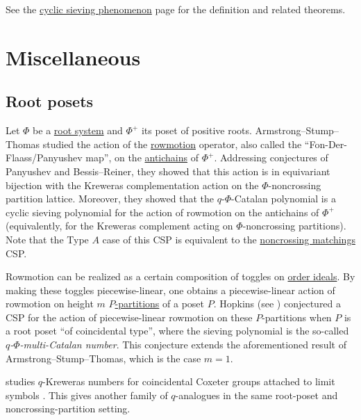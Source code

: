 
See the \hyperref[cyclicSieving]{cyclic sieving phenomenon}
page for the definition and related theorems.

\section[cspMisc]{Miscellaneous}


\subsection[cspListPosetsRoot]{Root posets}


Let $\Phi$ be a \hyperref[rootSystem]{root system} and $\Phi^+$ its poset of positive roots.
Armstrong--Stump--Thomas \cite{ArmstrongStumpThomas2013} studied the action of
the \hyperref[rowmotion]{rowmotion} operator, also called the
\enquote{Fon-Der-Flaass/Panyushev map}, on the \hyperref[antichain]{antichains}
of $\Phi^+$.
Addressing conjectures of Panyushev and Bessis--Reiner, they showed that this action is
in equivariant bijection with the Kreweras complementation action on
the $\Phi$-noncrossing partition lattice.
Moreover, they showed that the $q$-$\Phi$-Catalan polynomial is a cyclic sieving polynomial
for the action of rowmotion on the antichains of $\Phi^+$ (equivalently, for
the Kreweras complement acting on $\Phi$-noncrossing partitions).
Note that the Type $A$ case of this CSP is equivalent to
the \hyperref[cspNonCrossingMatchingsI]{noncrossing matchings} CSP.


Rowmotion can be realized as a certain composition of toggles on
\hyperref[orderIdeal]{order ideals}.
By making these toggles piecewise-linear, one obtains a piecewise-linear action
of rowmotion on height $m$ \hyperref[pPartition]{$P$-partitions} of a poset $P$.
Hopkins (see \cite{Hopkins2024}) conjectured a CSP for the action
of piecewise-linear rowmotion on these $P$-partitions when $P$ is a
root poset \enquote{of coincidental type}, where the sieving polynomial is
the so-called \emph{$q$-$\Phi$-multi-Catalan number}.
This conjecture extends the aforementioned result of Armstrong--Stump--Thomas, which is the case $m=1$.

 studies $q$-Kreweras numbers for coincidental Coxeter
groups attached to limit symbols \cite{Kim2020x}.  This gives another family
of $q$-analogues in the same root-poset and noncrossing-partition setting.

